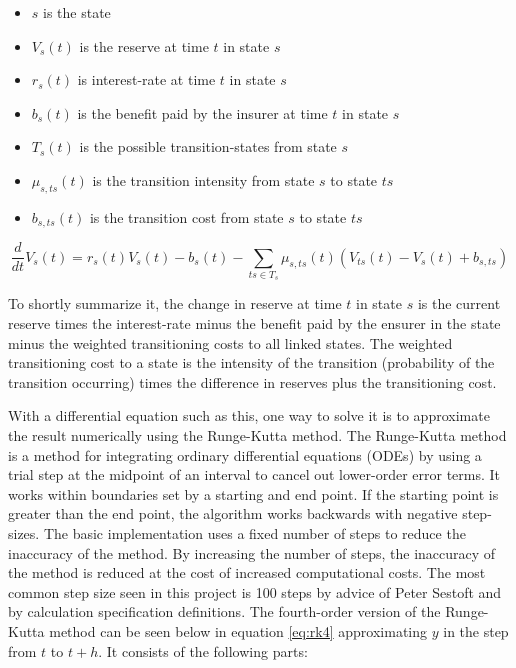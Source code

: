 \begin{itemize}
\item $s$ is the state
\item $V_s(t)$ is the reserve at time $t$ in state $s$
\item $r_s(t)$ is interest-rate at time $t$ in state $s$
\item $b_s(t)$ is the benefit paid by the insurer at time $t$ in state $s$
\item $T_s(t)$ is the possible transition-states from state $s$
\item $\mu_{s,ts}(t)$ is the transition intensity from state $s$ to state $ts$
\item $b_{s,ts}(t)$ is the transition cost from state $s$ to state $ts$
\end{itemize}

\begin{equation}\label{eq:thiele}
\frac{d}{dt}V_s(t) = r_s(t) V_s(t) - b_s(t) - \sum_{ts \in T_{s}} \mu_{s,ts}(t) (V_{ts}(t) - V_s(t) + b_{s,ts})
\end{equation}

To shortly summarize it, the change in reserve at time $t$ in state $s$ is the current reserve times the interest-rate minus the benefit paid by the ensurer in the state minus the weighted transitioning costs to all linked states. 
The weighted transitioning cost to a state is the intensity of the transition (probability of the transition occurring) times the difference in reserves plus the transitioning cost.

With a differential equation such as this, one way to solve it is to approximate the result numerically using the Runge-Kutta method.
The Runge-Kutta method\cite{press2007numerical} is a method for integrating ordinary differential equations (ODEs) by using a trial step at the midpoint of an interval to cancel out lower-order error terms.
It works within boundaries set by a starting and end point. 
If the starting point is greater than the end point, the algorithm works backwards with negative step-sizes.
The basic implementation uses a fixed number of steps to reduce the inaccuracy of the method. 
By increasing the number of steps, the inaccuracy of the method is reduced at the cost of increased computational costs.
The most common step size seen in this project is 100 steps by advice of Peter Sestoft and by calculation specification definitions.
The fourth-order version of the Runge-Kutta method can be seen below in equation \ref{eq:rk4} approximating $y$ in the step from $t$ to $t+h$. It consists of the following parts:


